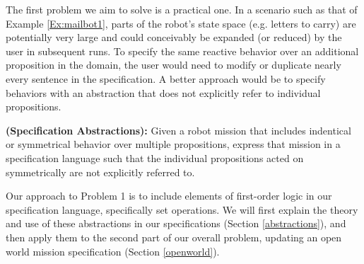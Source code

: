 The first problem we aim to solve is a practical one. In a scenario such as that of Example \ref{Ex:mailbot1}, parts of the robot's state space (e.g. letters to carry)  are potentially very large and could conceivably be expanded (or reduced) by the user in subsequent runs. To specify the same reactive behavior over an additional proposition in the domain, the user would need to modify or duplicate nearly every sentence in the specification. A better approach would be to specify behaviors with an abstraction that does not explicitly refer to individual propositions.  

\begin{myProblem}\label{Prop:groups}
	\textbf{(Specification Abstractions):}
	Given a robot mission that includes indentical or symmetrical behavior over multiple propositions, express that mission in a specification language such that the individual propositions acted on symmetrically are not explicitly referred to. 
\end{myProblem}

Our approach to Problem 1 is to include elements of first-order logic in our specification language, specifically set operations. We will first explain the theory and use of these abstractions in our specifications (Section \ref{abstractions}), and then apply them to the second part of our overall problem, updating an open world mission specification (Section \ref{openworld}). 

